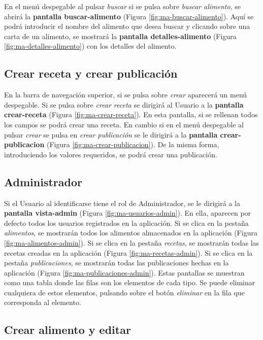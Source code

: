 En el menú despegable al pulsar \textit{buscar} si se pulsa sobre \textit{buscar alimento}, se abrirá la \textbf{pantalla buscar-alimento} (Figura \ref{fig:ma-buscar-alimento}). Aquí se podrá introducir el nombre del alimento que desea buscar y clicando sobre una carta de un alimento, se mostrará la \textbf{pantalla detalles-alimento} (Figura \ref{fig:ma-detalles-alimento}) con los detalles del alimento.

\subsection{Crear receta y crear publicación}

En la barra de navegación superior, si se pulsa sobre \textit{crear} aparecerá un menú despegable. Si se pulsa sobre \textit{crear receta} se dirigirá al Usuario a la \textbf{pantalla crear-receta} (Figura \ref{fig:ma-crear-receta}). En esta pantalla, si se rellenan todos los campos se podrá crear una receta. En cambio si en el menú despegable al pulsar \textit{crear} se pulsa en \textit{crear publicación} se le dirigirá a la \textbf{pantalla crear-publicacion} (Figura \ref{fig:ma-crear-publicacion}). De la misma forma, introduciendo los valores requeridos, se podrá crear una publicación. 


\subsection{Administrador}

Si el Usuario al identificarse tiene el rol de Administrador, se le dirigirá a la \textbf{pantalla vista-admin} (Figura \ref{fig:ma-usuarios-admin}). En ella, aparecen por defecto todos los usuarios registrados en la aplicación. Si se clica en la pestaña \textit{alimentos}, se mostrarán todos los alimentos almacenados en la aplicación (Figura \ref{fig:ma-alimentos-admin}). Si se clica en la pestaña \textit{recetas}, se mostrarán todas las recetas creadas en la aplicación (Figura \ref{fig:ma-recetas-admin}). Si se clica en la pestaña \textit{publicaciones}, se mostrarán todas las publicaciones hechas en la aplicación (Figura \ref{fig:ma-publicaciones-admin}). Estas pantallas se muestran como una tabla donde las filas son los elementos de cada tipo. Se puede eliminar cualquiera de estos elementos, pulsando sobre el botón \textit{eliminar} en la fila que corresponda al elemento. 

\subsection{Crear alimento y editar}

